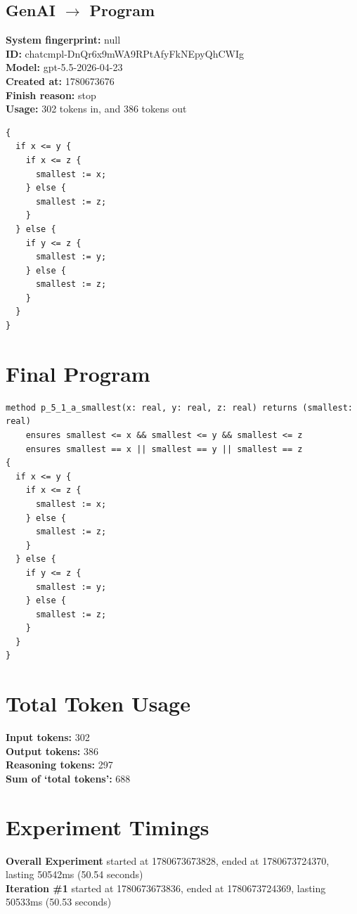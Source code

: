 \documentclass{article}
\begin{document}
\subsection*{GenAI $\rightarrow$ Program}
\textbf{System fingerprint: }null
\\\textbf{ID: }chatcmpl-DnQr6x9mWA9RPtAfyFkNEpyQhCWIg
\\\textbf{Model: }gpt-5.5-2026-04-23
\\\textbf{Created at: }1780673676
\\\textbf{Finish reason: }stop
\\\textbf{Usage: }302 tokens in, and 386 tokens out
\begin{lstlisting}
{
  if x <= y {
    if x <= z {
      smallest := x;
    } else {
      smallest := z;
    }
  } else {
    if y <= z {
      smallest := y;
    } else {
      smallest := z;
    }
  }
}
\end{lstlisting}
\section*{Final Program}
\begin{lstlisting}
method p_5_1_a_smallest(x: real, y: real, z: real) returns (smallest: real)
	ensures smallest <= x && smallest <= y && smallest <= z
	ensures smallest == x || smallest == y || smallest == z
{
  if x <= y {
    if x <= z {
      smallest := x;
    } else {
      smallest := z;
    }
  } else {
    if y <= z {
      smallest := y;
    } else {
      smallest := z;
    }
  }
}
\end{lstlisting}
\section*{Total Token Usage}
\textbf{Input tokens: }302
\\\textbf{Output tokens: }386
\\\textbf{Reasoning tokens: }297
\\\textbf{Sum of `total tokens': }688
\section*{Experiment Timings}
\textbf{Overall Experiment} started at 1780673673828, ended at 1780673724370, lasting 50542ms (50.54 seconds)
\\\textbf{Iteration \#1} started at 1780673673836, ended at 1780673724369, lasting 50533ms (50.53 seconds)
\end{document}
